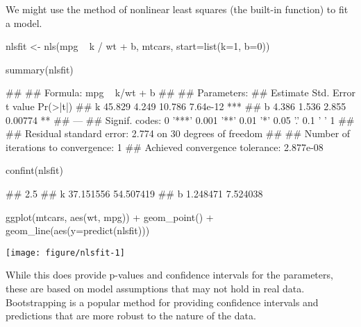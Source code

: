 We might use the method of nonlinear least squares (the built-in  function) to fit a model.

\begin{center}

\begin{example}
nlsfit <- nls(mpg ~ k / wt + b, mtcars, start=list(k=1, b=0))
\end{example}

\begin{example}
summary(nlsfit)
\end{example}

\begin{example}
## 
## Formula: mpg ~ k/wt + b
## 
## Parameters:
##   Estimate Std. Error t value Pr(>|t|)    
## k   45.829      4.249  10.786 7.64e-12 ***
## b    4.386      1.536   2.855  0.00774 ** 
## ---
## Signif. codes:  0 '***' 0.001 '**' 0.01 '*' 0.05 '.' 0.1 ' ' 1
## 
## Residual standard error: 2.774 on 30 degrees of freedom
## 
## Number of iterations to convergence: 1 
## Achieved convergence tolerance: 2.877e-08

\end{example}

\begin{example}
confint(nlsfit)
\end{example}

\begin{example}
##        2.5%
## k 37.151556 54.507419
## b  1.248471  7.524038

\end{example}

\begin{example}
ggplot(mtcars, aes(wt, mpg)) + geom_point() + geom_line(aes(y=predict(nlsfit)))
\end{example}

\texttt{[image: figure/nlsfit-1]} 
\end{center}

While this does provide p-values and confidence intervals for the parameters, these are based on model assumptions that may not hold in real data. Bootstrapping is a popular method for providing confidence intervals and predictions that are more robust to the nature of the data.





